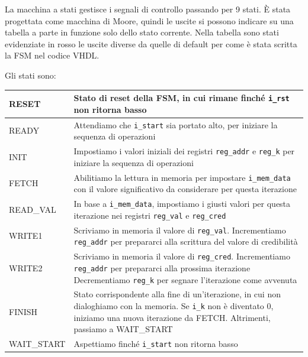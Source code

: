 \documentclass{article}
\begin{document}
La macchina a stati gestisce i segnali di controllo passando per 9 stati. È stata progettata come macchina di Moore, quindi le uscite si possono indicare su una tabella a parte in funzione solo dello stato corrente. Nella tabella sono stati evidenziate in rosso le uscite diverse da quelle di default per come è stata scritta la FSM nel codice VHDL.

Gli stati sono:
\begin{table}[H]
    \centering
    \begin{tabular}{|l|p{15cm}|}
        \hline
        RESET & Stato di reset della FSM, in cui rimane finché \texttt{i\_rst} non ritorna basso \\
        \hline
        READY & Attendiamo che \texttt{i\_start} sia portato alto, per iniziare la sequenza di operazioni \\
        \hline
        INIT & Impostiamo i valori iniziali dei registri \texttt{reg\_addr} e \texttt{reg\_k} per iniziare la sequenza di operazioni \\
        \hline
        FETCH & Abilitiamo la lettura in memoria per impostare \texttt{i\_mem\_data} con il valore significativo da considerare per questa iterazione \\
        \hline
        READ\_VAL & In base a \texttt{i\_mem\_data}, impostiamo i giusti valori per questa iterazione nei registri \texttt{reg\_val} e \texttt{reg\_cred} \\
        \hline
        WRITE1 & Scriviamo in memoria il valore di \texttt{reg\_val}. \newline Incrementiamo \texttt{reg\_addr} per prepararci alla scrittura del valore di credibilità \\
        \hline
        WRITE2 & Scriviamo in memoria il valore di \texttt{reg\_cred}. \newline Incrementiamo \texttt{reg\_addr} per prepararci alla prossima iterazione \newline Decrementiamo \texttt{reg\_k} per segnare l’iterazione come avvenuta \\
        \hline
        FINISH & Stato corrispondente alla fine di un’iterazione, in cui non dialoghiamo con la memoria. Se \texttt{i\_k} non è diventato 0, iniziamo una nuova iterazione da FETCH. Altrimenti, passiamo a WAIT\_START \\
        \hline
        WAIT\_START & Aspettiamo finché \texttt{i\_start} non ritorna basso \\
        \hline
    \end{tabular}
\end{table}
\end{document}
